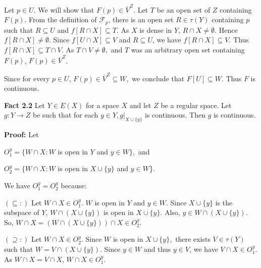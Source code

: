 \documentclass{article}
\begin{document}
\vskip 10pt

Let $p\in U.$ We will show that $F(p)\in \overline{V}^Z.$ Let $T$ be an open set of $Z$ containing $F(p)$. From the definition of $\mathcal{F}_p$, there is an open set $R\in \tau(Y)$ containing $p$ such that $R\subseteq U$ and $f\left[R\cap X\right]\subseteq T.$ As $X$ is dense in $Y$, $R\cap X\neq \emptyset$. Hence $f\left[R\cap X\right]\neq \emptyset.$ Since $f\left[U\cap X\right]\subseteq V$ and $R\subseteq U$, we have $f\left[R\cap X\right]\subseteq V$. Thus $f\left[R\cap X\right]\subseteq T\cap V.$ As $T\cap V\neq \emptyset,$ and $T$ was an arbitrary open set containing $F(p)$, $F(p)\in \overline{V}^Z$.

\vskip 10pt

Since for every $p\in U$, $F(p)\in \overline{V}^Z\subseteq W,$ we conclude that $F[U]\subseteq W.$ Thus $F$ is continuous.










\vskip 40pt













\textbf{Fact 2.2 } Let $Y\in E(X)$ for a space $X$ and let $Z$ be a regular space. Let $g:Y\rightarrow Z$ be such that for each $y\in Y, g|_{X\cup \{y\}}$ is continuous. Then $g$ is continuous.

\vskip 15pt

\textbf{Proof: } Let 
\begin{center}
$O_1^y=\{W\cap X: W$ is open in $Y$ and $y\in W\},$ and 

$O_2^y=\{W\cap X: W$ is open in $X\cup \{y\}$ and $y\in W$\}. 
\end{center}


We have $O_1^y=O_2^y$ because: 

\vskip 5pt
$(\subseteq:) $ Let $W\cap X \in O_1^y$. $W$ is open in $Y$ and $y\in W.$ Since $X\cup \{y\}$ is the subspace of $Y$, $W\cap (X\cup \{y\})$ is open in $X\cup \{y\}$. Also, $y\in W\cap (X\cup \{y\}).$ So, $W\cap X=\left(W\cap \left(X\cup\{y\}\right)\right)\cap X \in O_2^y$.


$(\supseteq:)$ Let $W\cap X\in O_2^y$. Since $W$ is open in $X\cup \{y\},$ there exists $V\in \tau(Y)$ such that $W=V\cap (X\cup \{y\})$. Since $y\in W$ and thus $y\in V$, we have $V\cap X \in O_1^y$. As $W\cap X=V\cap X$, $W\cap X \in O_1^y$. 
\end{document}

